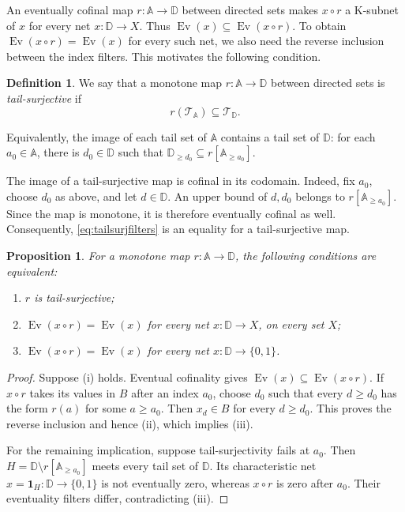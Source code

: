 \documentclass[11pt,a4paper]{article}
\newtheorem{proposition}[theorem]{Proposition}
\theoremstyle{definition}
\newtheorem{definition}[theorem]{Definition}
\theoremstyle{remark}
\newcommand{\TT}{\mathcal T}
\newcommand{\Ev}{\operatorname{Ev}}
\begin{document}
An eventually cofinal map \(r:\mathbb A\to\mathbb D\) between
directed sets makes \(x\circ r\) a K-subnet of \(x\) for every
net \(x:\mathbb D\to X\). Thus \(\Ev(x)\subseteq\Ev(x\circ r)\).
To obtain \(\Ev(x\circ r)=\Ev(x)\) for every such net, we also
need the reverse inclusion between the index filters. This motivates
the following condition.

\begin{definition}\label{def:tailsurj}
We say that a monotone map \(r:\mathbb A\to\mathbb D\) between directed sets is
\emph{tail-surjective} if
\begin{equation}\label{eq:tailsurjfilters}
 r(\TT_{\mathbb A})\subseteq\TT_{\mathbb D}.
\end{equation}

Equivalently, the image of each tail set of \(\mathbb A\) contains a tail set
of \(\mathbb D\): for each \(a_0\in\mathbb A\), there is
\(d_0\in\mathbb D\) such that
\(\mathbb D_{\ge d_0}\subseteq r[\mathbb A_{\ge a_0}]\).
\end{definition}

The image of a tail-surjective map is cofinal in its codomain.
Indeed, fix \(a_0\), choose
\(d_0\) as above, and let \(d\in\mathbb D\). An upper bound of
\(d,d_0\) belongs to \(r[\mathbb A_{\ge a_0}]\). Since the map is
monotone, it is therefore eventually cofinal as well. Consequently,
\eqref{eq:tailsurjfilters} is an equality for a tail-surjective map.

\begin{proposition}\label{prop:binary}
For a monotone map \(r:\mathbb A\to\mathbb D\), the following
conditions are equivalent:
\begin{enumerate}[label=(\roman*)]
\item \(r\) is tail-surjective;
\item \(\Ev(x\circ r)=\Ev(x)\) for every net \(x:\mathbb D\to X\),
on every set \(X\);
\item \(\Ev(x\circ r)=\Ev(x)\) for every net
\(x:\mathbb D\to\{0,1\}\).
\end{enumerate}
\end{proposition}
\begin{proof}
Suppose (i) holds. Eventual cofinality gives
\(\Ev(x)\subseteq\Ev(x\circ r)\). If \(x\circ r\) takes its values
in \(B\) after an index \(a_0\), choose \(d_0\) such that every
\(d\ge d_0\) has the form \(r(a)\) for some \(a\ge a_0\).
Then \(x_d\in B\) for every \(d\ge d_0\). This proves the reverse
inclusion and hence (ii), which implies (iii).

For the remaining implication, suppose tail-surjectivity fails at
\(a_0\). Then
\(H=\mathbb D\setminus r[\mathbb A_{\ge a_0}]\) meets every tail set
of \(\mathbb D\). Its characteristic net
\(x=\mathbf1_H:\mathbb D\to\{0,1\}\) is not eventually zero,
whereas \(x\circ r\) is zero after \(a_0\). Their eventuality
filters differ, contradicting (iii).
\end{proof}
\end{document}
